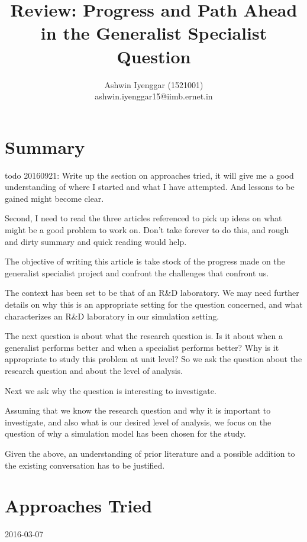 \documentclass[12pt]{article}
\begin{document}
\title{Review: Progress and Path Ahead in the Generalist Specialist Question}
\author{Ashwin Iyenggar  (1521001) \\ ashwin.iyenggar15@iimb.ernet.in} 


\maketitle
\thispagestyle{empty}

\section{Summary}\label{S:Summary}
todo 20160921: Write up the section on approaches tried, it will give me a good understanding of where I started and what I have attempted. And lessons to be gained might become clear.

Second, I need to read the three articles referenced to pick up ideas on what might be a good problem to work on. Don't take forever to do this, and rough and dirty summary and quick reading would help.

The objective of writing this article is take stock of the progress made on the generalist specialist project and confront the challenges that confront us.

The context has been set to be that of an R\&D laboratory. We may need further details on why this is an appropriate setting for the question concerned, and what characterizes an R\&D laboratory in our simulation setting.

The next question is about what the research question is. Is it about when a generalist performs better and when a specialist performs better? Why is it appropriate to study this problem at unit level? So we ask the question about the research question and about the level of analysis.

Next we ask why the question is interesting to investigate. 

Assuming that we know the research question and why it is important to investigate, and also what is our desired level of analysis, we focus on the question of why a simulation model has been chosen for the study.

Given the above, an understanding of prior literature and a possible addition to the existing conversation has to be justified.

\section{Approaches Tried}
2016-03-07
\end{document}
